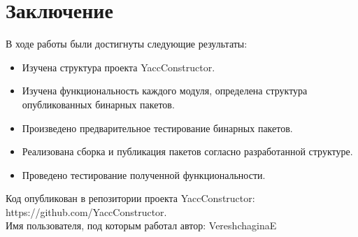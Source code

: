 \documentclass{matmex-diploma-custom}
\begin{document}
\section*{Заключение}
В ходе работы были достигнуты следующие результаты:
\begin{itemize}
\item Изучена структура проекта  YaccConstructor.
\item Изучена функциональность каждого модуля, определена структура опубликованных бинарных пакетов.
\item Произведено предварительное тестирование бинарных пакетов.
\item Реализована сборка и публикация пакетов согласно разработанной структуре.
\item Проведено тестирование полученной функциональности.\\
\end{itemize}
Код опубликован в репозитории проекта YaccConstructor: \\ https://github.com/YaccConstructor.\\
Имя пользователя, под которым работал автор: VereshchaginaE





\end{document}
